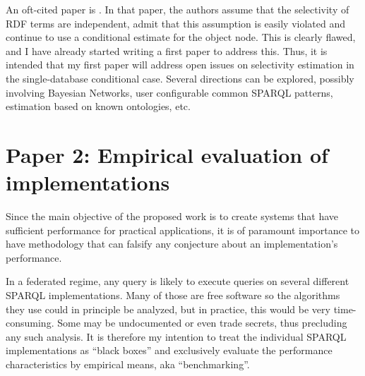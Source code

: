 \documentclass[a4paper,english,10pt]{article}
\begin{document}
An oft-cited paper is \cite{Stocker:2008:SBG:1367497.1367578}. In that
paper, the authors assume that the selectivity of RDF terms are
independent, admit that this assumption is easily violated and
continue to use a conditional estimate for the object node. This is
clearly flawed, and I have already started writing a first paper to
address this. Thus, it is intended that my first paper will address
open issues on selectivity estimation in the single-database
conditional case.  Several directions can be explored, possibly
involving Bayesian Networks, user configurable common SPARQL patterns,
estimation based on known ontologies, etc.

\section*{Paper 2: Empirical evaluation of implementations}

Since the main objective of the proposed work is to create systems
that have sufficient performance for practical applications, it is of
paramount importance to have methodology that can falsify any
conjecture about an implementation's performance.

In a federated regime, any query is likely to execute queries on
several different SPARQL implementations. Many of those are free
software so the algorithms they use could in principle be analyzed,
but in practice, this would be very time-consuming. Some may be
undocumented or even trade secrets, thus precluding any such
analysis. It is therefore my intention to treat the individual SPARQL
implementations as ``black boxes'' and exclusively evaluate the
performance characteristics by empirical means, aka ``benchmarking''.
\end{document}
